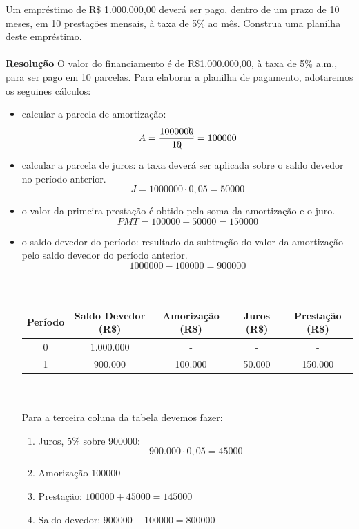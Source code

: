 \documentclass[a4paper, 12pt]{article}
\begin{document}
Um empréstimo de R\$ 1.000.000,00 deverá ser pago, dentro de um prazo de 10 meses, em 10 prestações mensais, à taxa de 5\% ao mês. Construa uma planilha deste empréstimo.\\\\
\textbf{Resolução}
O valor do financiamento é de R\$1.000.000,00, à taxa de 5\% a.m., para ser pago em 10 parcelas. Para elaborar a planilha de pagamento, adotaremos os seguines cálculos:\\
\begin{itemize}
\item calcular a parcela de amortização:\\
  $$ A = \frac{100000\bcancel{0}}{1\bcancel{0}}=100000$$
\item calcular a parcela de juros: a taxa deverá ser aplicada sobre o saldo devedor no período anterior.\\
  $$ J = 1000000 \cdot 0,05 = 50000$$
\item o valor da primeira prestação é obtido pela soma da amortização e o juro.\\
  $$ PMT = 100000 + 50000 = 150000 $$
\item o saldo devedor do período: resultado da subtração do valor da amortização pelo saldo devedor do período anterior.\\
  $$ 1000000 - 100000 = 900000 $$\\\\
  \begin{tabular}{ | c | c | c | c | c |}
  \hline
  Período & Saldo Devedor (R\$) & Amorização (R\$) & Juros (R\$) & Prestação (R\$) \\ \hline
  0 & 1.000.000 & - & - & - \\ \hline
  1 &   900.000 & 100.000 & 50.000 & 150.000 \\ \hline
  \end{tabular} \\\\
  Para a terceira coluna da tabela devemos fazer:\\
  \begin{enumerate}
  \item Juros, 5\% sobre 900000:\\
    $$ 900.000 \cdot 0,05 = 45000 $$
  \item Amorização 100000
  \item Prestação: $ 100000 + 45000 = 145000 $
  \item Saldo devedor: $ 900000 - 100000 = 800000 $    
  \end{enumerate}

\end{itemize}
\end{document}
